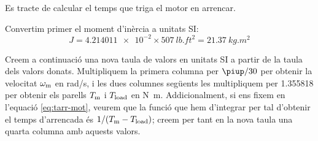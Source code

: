 \begin{exemple}
 Es tracte de calcular el temps que triga el motor en arrencar.

Convertim primer el moment d'inèrcia a unitats SI:
\[
    J = \num{4,214011e-2}\times\SI{507}{lb.ft^2} = \SI{21,37}{kg.m^2}
\]

Creem a continuació una nova taula de valors en unitats SI a partir de la taula dels valors donats. Multipliquem la primera columna per $\piup/30$ per obtenir la velocitat $\omega_\mathrm{m}$ en \si{rad/s}, i les dues columnes següents les multipliquem per \num{1,355818} per obtenir els parells $T_\mathrm{m}$ i $T_\mathrm{load}$ en \si{N.m}. Addicionalment, si ens fixem en l'equació \eqref{eq:tarr-mot}, veurem que la funció que hem d'integrar per tal d'obtenir el temps d'arrencada és $1/(T_\mathrm{m}-T_\mathrm{load})$; creem per tant en la nova taula una quarta columna amb aquests valors.


\end{exemple}
